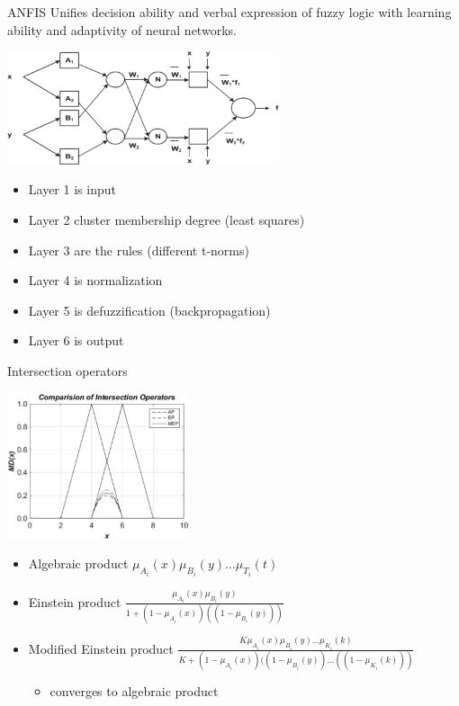\begin{frame}{\acf{ANFIS}}
  Unifies decision ability and verbal expression of fuzzy logic with
  learning ability and adaptivity of neural networks.
  \begin{center}
    \includegraphics[width=0.6\textwidth]{img/anfis.png}
  \end{center}
  \pause
  \begin{itemize}
  \item Layer 1 is \alert{input}\pause
  \item Layer 2 \alert{cluster membership} degree (least squares)\pause
  \item Layer 3 are the \alert{rules} (different t-norms)\pause
  \item Layer 4 is \alert{normalization}\pause
  \item Layer 5 is \alert{defuzzification} (backpropagation)\pause
  \item Layer 6 is \alert{output}
  \end{itemize}
\end{frame}

\begin{frame}{Intersection operators}
  \begin{center}
    \includegraphics[width=0.4\textwidth]{img/operators.png}
  \end{center}
  \begin{itemize}
  \item \alert{Algebraic product} $\mu_{A_i}(x)\mu_{B_i}(y)\dots \mu_{T_i}(t)$\pause
  \item \alert{Einstein product} $\frac{\mu_{A_i}(x)\mu_{B_i}(y)}{1+(1-\mu_{A_i}(x))((1-\mu_{B_i}(y)))}$\pause
  \item \alert{Modified Einstein product}
    $\frac{K\mu_{A_i}(x)\mu_{B_i}(y)\dots\mu_{K_i}(k)}{K+(1-\mu_{A_i}(x))((1-\mu_{B_i}(y))\dots
      ((1-\mu_{K_i}(k)))}$\pause
    \begin{itemize}
    \item converges to algebraic product
    \end{itemize}
  \end{itemize}
\end{frame}

